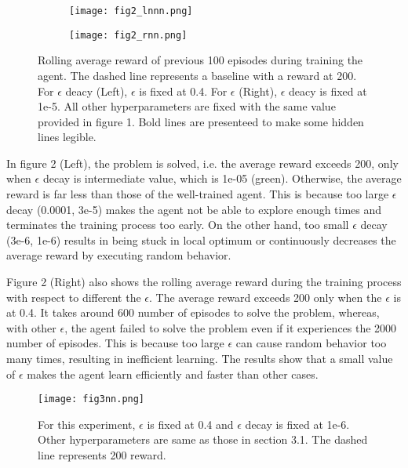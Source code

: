 \documentclass{article}
\begin{document}
\begin{figure}[h]
  \centering
   \begin{subfigure}[b]{0.43\linewidth}
    \texttt{[image: fig2\_lnnn.png]}
  \end{subfigure}
  \begin{subfigure}[b]{0.43\linewidth}
    \texttt{[image: fig2\_rnn.png]}
  \end{subfigure}
    \caption{Rolling average reward of previous 100 episodes during training the agent. The dashed line represents a baseline with a reward at 200. For  $\epsilon$ deacy (Left), $\epsilon$ is fixed at 0.4. For $\epsilon$ (Right), $\epsilon$ deacy is fixed at 1e-5. All other hyperparameters are fixed with the same value provided in figure 1. Bold lines are presenteed to make some hidden lines legible.}
\end{figure}

In figure 2 (Left), the problem is solved, i.e. the average reward exceeds 200, only when $\epsilon$ decay is intermediate value, which is  1e-05 (green). Otherwise, the average reward is far less than those of the well-trained agent. This is because too large $\epsilon$ decay (0.0001, 3e-5) makes the agent not be able to explore enough times and terminates the training process too early. On the other hand, too small $\epsilon$ decay (3e-6, 1e-6) results in being stuck in local optimum or continuously decreases the average reward by executing random behavior.

Figure 2 (Right) also shows the rolling average reward during the training process with respect to different the $\epsilon$. The average reward exceeds 200 only when the $\epsilon$ is at 0.4. It takes around 600 number of episodes to solve the problem, whereas, with other $\epsilon$, the agent failed to solve the problem even if it experiences the 2000 number of episodes. This is because too large $\epsilon$ can cause random behavior too many times, resulting in inefficient learning. The results show that a small value of $\epsilon$ makes the agent learn efficiently and faster than other cases.

\begin{figure}[H]
  \centering
    \texttt{[image: fig3nn.png]}
  \caption{For this experiment, $\epsilon$ is fixed at 0.4 and $\epsilon$ decay is fixed at 1e-6. Other hyperparameters are same as those in section 3.1. The dashed line represents 200 reward.}
\end{figure}
\end{document}
